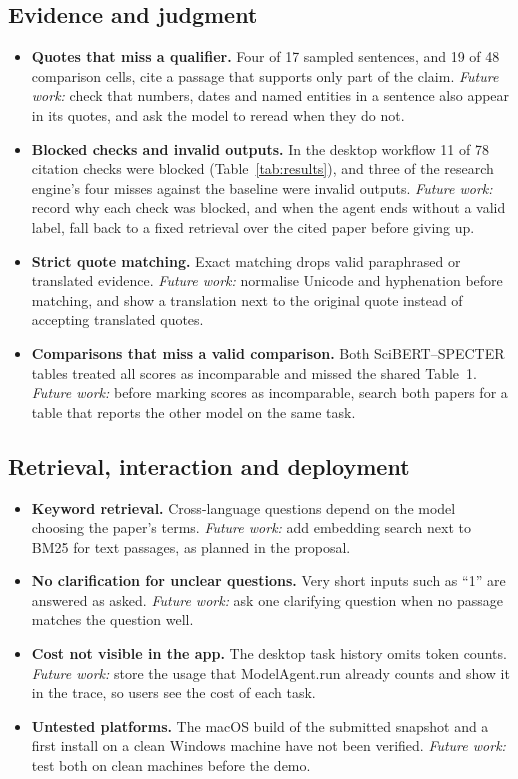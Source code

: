 \documentclass{article}
\newcommand{\code}[1]{{\ttfamily\small\hyphenchar\font=-1\relax #1}}
\begin{document}
\subsection{Evidence and judgment}
\begin{itemize}
  \item \textbf{Quotes that miss a qualifier.} Four of 17 sampled sentences, and 19 of 48 comparison
  cells, cite a passage that supports only part of the claim. \emph{Future work:} check that numbers,
  dates and named entities in a sentence also appear in its quotes, and ask the model to reread when
  they do not.
  \item \textbf{Blocked checks and invalid outputs.} In the desktop workflow 11 of 78 citation checks
  were blocked (Table~\ref{tab:results}), and three of the research engine's four misses against the
  baseline were invalid outputs. \emph{Future work:} record why each check was blocked, and when the
  agent ends without a valid label, fall back to a fixed retrieval over the cited paper before giving
  up.
  \item \textbf{Strict quote matching.} Exact matching drops valid paraphrased or translated evidence.
  \emph{Future work:} normalise Unicode and hyphenation before matching, and show a translation next to
  the original quote instead of accepting translated quotes.
  \item \textbf{Comparisons that miss a valid comparison.} Both SciBERT--SPECTER tables treated all
  scores as incomparable and missed the shared Table~1. \emph{Future work:} before marking scores as
  incomparable, search both papers for a table that reports the other model on the same task.
\end{itemize}

\subsection{Retrieval, interaction and deployment}
\begin{itemize}
  \item \textbf{Keyword retrieval.} Cross-language questions depend on the model choosing the paper's
  terms. \emph{Future work:} add embedding search next to BM25 for text passages, as planned in the
  proposal.
  \item \textbf{No clarification for unclear questions.} Very short inputs such as ``1'' are answered
  as asked. \emph{Future work:} ask one clarifying question when no passage matches the question well.
  \item \textbf{Cost not visible in the app.} The desktop task history omits token counts.
  \emph{Future work:} store the \code{usage} that \code{ModelAgent.run} already counts and show it in
  the trace, so users see the cost of each task.
  \item \textbf{Untested platforms.} The macOS build of the submitted snapshot and a first install on
  a clean Windows machine have not been verified. \emph{Future work:} test both on clean machines
  before the demo.
\end{itemize}
\end{document}
